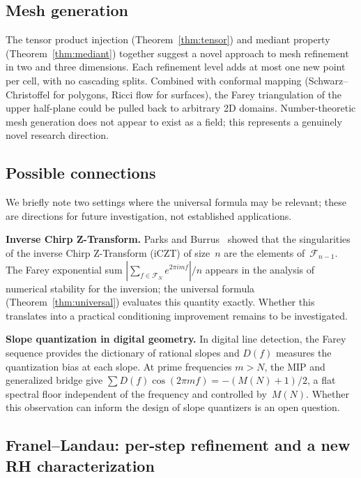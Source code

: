 \documentclass[11pt]{article}
\theoremstyle{definition}
\newcommand{\F}{\mathcal{F}}
\begin{document}
\subsection{Mesh generation}

The tensor product injection (Theorem~\ref{thm:tensor})
and mediant property (Theorem~\ref{thm:mediant}) together
suggest a novel approach to mesh refinement in two and three
dimensions.  Each refinement level adds at most one new
point per cell, with no cascading splits.  Combined with
conformal mapping (Schwarz--Christoffel for polygons,
Ricci flow for surfaces), the Farey triangulation of the
upper half-plane could be pulled back to arbitrary 2D
domains.  Number-theoretic mesh generation does not appear
to exist as a field; this represents a genuinely novel
research direction.

\subsection{Possible connections}

We briefly note two settings where the universal formula may
be relevant; these are directions for future investigation,
not established applications.

\textbf{Inverse Chirp Z-Transform.}\quad
Parks and Burrus~\cite{ParksBurrus2020} showed that the
singularities of the inverse Chirp Z-Transform (iCZT) of
size~$n$ are the elements of~$\F_{n-1}$.  The Farey exponential
sum $|\sum_{f \in \F_N} e^{2\pi imf}|/n$ appears in the
analysis of numerical stability for the inversion; the universal
formula (Theorem~\ref{thm:universal}) evaluates this quantity
exactly.  Whether this translates into a practical conditioning
improvement remains to be investigated.

\textbf{Slope quantization in digital geometry.}\quad
In digital line detection, the Farey sequence provides the
dictionary of rational slopes and $D(f)$ measures the
quantization bias at each slope.
At prime frequencies $m > N$, the MIP and generalized bridge
give $\sum D(f) \cos(2\pi mf) = -(M(N)+1)/2$, a flat spectral
floor independent of the frequency and controlled by~$M(N)$.
Whether this observation can inform the design of slope
quantizers is an open question.

\subsection{Franel--Landau: per-step refinement and a new RH
characterization}
\end{document}
